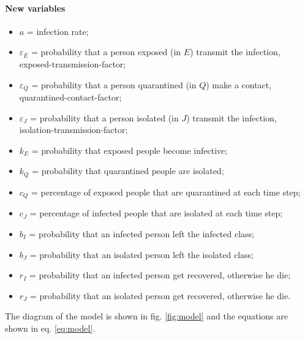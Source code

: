 \documentclass[12pt]{llncs}
\begin{document}
\paragraph{New variables}
\begin{itemize}
\item $a$ = infection rate;
\item $\varepsilon_E$ = probability that a person exposed (in $E$) transmit the infection, exposed-transmission-factor;
\item $\varepsilon_Q$ = probability that a person quarantined (in $Q$) make a contact, quarantined-contact-factor;
\item $\varepsilon_J$ = probability that a person isolated (in $J$) transmit the infection, isolation-transmission-factor;
\item $k_E$ = probability that exposed people become infective;
\item $k_Q$ = probability that quarantined people are isolated;
\item $c_Q$ = percentage of exposed people that are quarantined at each time step;
\item $c_J$ = percentage of infected people that are isolated at each time step;
\item $b_I$ = probability that an infected person left the infected class;
\item $b_J$ = probability that an isolated person left the isolated class;
\item $r_I$ = probability that an infected person get recovered, otherwise he die;
\item $r_J$ = probability that an isolated person get recovered, otherwise he die.
\end{itemize}
The diagram of the model is shown in fig. \ref{fig:model} and the equations are shown in eq. \ref{eq:model}.
\end{document}
